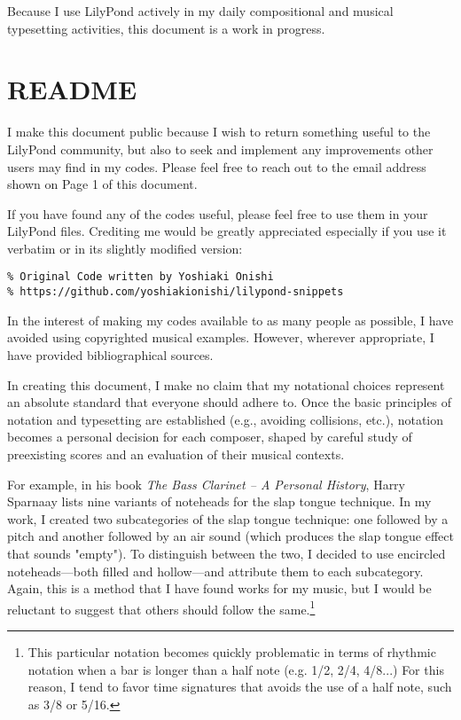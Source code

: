 \documentclass[11pt, oneside]{book}   	%
\begin{document}
Because I use LilyPond actively in my daily compositional and musical typesetting activities, this document is a work in progress. 

\section{README}

I make this document public because I wish to return something useful to the LilyPond community, but also to seek and implement any improvements other users may find in my codes. Please feel free to reach out to the email address shown on Page 1 of this document.

If you have found any of the codes useful, please feel free to use them in your LilyPond files. Crediting me would be greatly appreciated especially if you use it verbatim or in its slightly modified version:

\begin{verbatim}
% Original Code written by Yoshiaki Onishi
% https://github.com/yoshiakionishi/lilypond-snippets
\end{verbatim}

In the interest of making my codes available to as many people as possible, I have avoided using copyrighted musical examples. However, wherever appropriate, I have provided bibliographical sources.

In creating this document, I make no claim that my notational choices represent an absolute standard that everyone should adhere to. Once the basic principles of notation and typesetting are established (e.g., avoiding collisions, etc.), notation becomes a personal decision for each composer, shaped by careful study of preexisting scores and an evaluation of their musical contexts. 

For example, in his book \textit{The Bass Clarinet – A Personal History}, Harry Sparnaay lists nine variants of noteheads for the slap tongue technique.\autocite[66]{HS2012} In my work, I created two subcategories of the slap tongue technique: one followed by a pitch and another followed by an air sound (which produces the slap tongue effect that sounds "empty"). To distinguish between the two, I decided to use encircled noteheads—both filled and hollow—and attribute them to each subcategory. Again, this is a method that I have found works for my music, but I would be reluctant to suggest that others should follow the same.\footnote{This particular notation becomes quickly problematic in terms of rhythmic notation when a bar is longer than a half note (e.g. 1/2, 2/4, 4/8...) For this reason, I tend to favor time signatures that avoids the use of a half note, such as 3/8 or 5/16.} 
\end{document}

